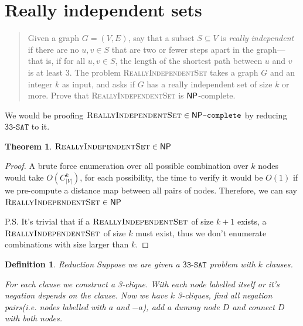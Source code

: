 
\newtheorem{theorem}{Theorem}
\newtheorem{lemma}[theorem]{Lemma}
\newtheorem{definition}{Definition}[section]


\maketitle
\thispagestyle{firststyle}
\vspace{-2.0cm}

\newcommand{\RIS}{\textsc{ReallyIndependentSet}}
\newcommand{\NPC}{\mathsf{NP}\texttt{-complete}}
\newcommand{\tSAT}{\mathsf{3}\texttt{3-SAT}}

\section{Really independent sets}
    \begin{quote}
    Given a graph $G = (V,E)$, say that a subset $S \subseteq V$ is \emph{really independent} if there are no $u,v \in S$ that are two or fewer steps apart in the graph---that is, if for all $u,v \in S$, the length of the shortest path
    between $u$ and $v$ is at least 3.
    The problem \textsc{ReallyIndependentSet} takes a graph $G$ and an integer $k$ as input, and asks if $G$ has a really independent set of size $k$ or more.
    Prove that \textsc{ReallyIndependentSet} is $\mathsf{NP}$-complete.
    \end{quote}

We would be proofing $\RIS \in \NPC$ by reducing $\tSAT$ to it. 

\begin{theorem}
    $\RIS \in \NP $
\end{theorem}

\begin{proof}
    A brute force enumeration over all possible combination over $k$ nodes would take $O(C^k_{|V|})$, for each possibility, the time to verify it would be $O(1)$ if we pre-compute a distance map between all pairs of nodes.
    Therefore, we can say $\RIS \in \NP$
    
    P.S. It's trivial that if a $\RIS$ of size $k+1$ exists, a $\RIS$ of size $k$ must exist, thus we don't enumerate combinations with size larger than $k$.
\end{proof}

\begin{definition}{Reduction}
    Suppose we are given a $\tSAT$ problem with $k$ clauses.

    For each clause we construct a 3-clique. With each node labelled itself or it's negation depends on the clause.
    Now we have $k$ 3-cliques, find all negation pairs(i.e. nodes labelled with $a$ and $-a$), add a dummy node $D$ and connect $D$ with both nodes.
\end{definition}


